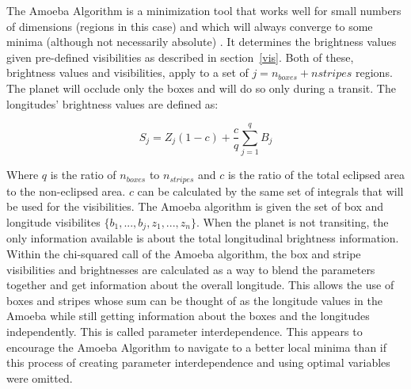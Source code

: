The Amoeba Algorithm is a minimization tool that works well for small numbers of dimensions (regions in this case) and which will always converge to some minima (although not necessarily absolute) \cite{NR}. It determines the brightness values given pre-defined visibilities as described in section~\ref{vis}. Both of these, brightness values and visibilities, apply to a set of $j = n_{boxes} + n{stripes}$ regions. The planet will occlude only the boxes and will do so only during a transit. The longitudes' brightness values are defined as:

\begin{equation}
S_j = Z_j (1 - c) + \frac{c}{q} \sum_{j=1}^{q}B_j
\label{z_val}
\end{equation}


Where $q$ is the ratio of $n_{boxes}$ to $n_{stripes}$ and $c$ is the ratio of the total eclipsed area to the non-eclipsed area. $c$ can be calculated by the same set of integrals that will be used for the visibilities. The Amoeba algorithm is given the set of box and longitude visibilites $\{b_1, ..., b_j, z_1, ..., z_n\}$. When the planet is not transiting, the only information available is about the total longitudinal brightness information. Within the chi-squared call of the Amoeba algorithm, the box and stripe visibilities and brightnesses are calculated as a way to blend the parameters together and get information about the overall longitude. This allows the use of boxes and stripes whose sum can be thought of as the longitude values in the Amoeba while still getting information about the boxes and the longitudes independently. This is called parameter interdependence. This appears to encourage the Amoeba Algorithm to navigate to a better local minima than if this process of creating parameter interdependence and using optimal variables were omitted. 





















